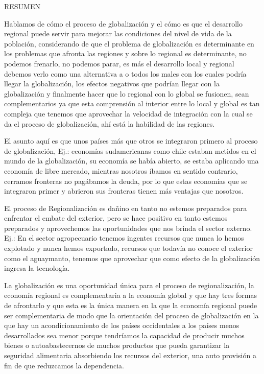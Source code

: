 \documentclass[
  a4paper,
]{article}
\begin{document}
RESUMEN

Hablamos de cómo el proceso de globalización y el cómo es que el
desarrollo regional puede servir para mejorar las condiciones del nivel
de vida de la población, considerando de que el problema de
globalización es determinante en los problemas que afronta las regiones
y sobre lo regional es determinante, no podemos frenarlo, no podemos
parar, es más el desarrollo local y regional debemos verlo como una
alternativa a o todos los males con los cuales podría llegar la
globalización, los efectos negativos que podrían llegar con la
globalización y finalmente hacer que lo regional con lo global se
fusionen, sean complementarios ya que esta comprensión al interior entre
lo local y global es tan compleja que tenemos que aprovechar la
velocidad de integración con la cual se da el proceso de globalización,
ahí está la habilidad de las regiones.

El asunto aquí es que unos países más que otros se integraron primero al
proceso de globalización, Ej.: economías sudamericanas como chile
estaban metidos en el mundo de la globalización, su economía se había
abierto, se estaba aplicando una economía de libre mercado, mientras
nosotros íbamos en sentido contrario, cerramos fronteras no pagábamos la
deuda, por lo que estas economías que se integraron primer y abrieron
sus fronteras tienen más ventajas que nosotros.

El proceso de Regionalización es dañino en tanto no estemos preparados
para enfrentar el embate del exterior, pero se hace positivo en tanto
estemos preparados y aprovechemos las oportunidades que nos brinda el
sector externo. Ej.: En el sector agropecuario tenemos ingentes recursos
que nunca lo hemos explotado y nunca hemos exportado, recursos que
todavía no conoce el exterior como el aguaymanto, tenemos que aprovechar
que como efecto de la globalización ingresa la tecnología.

La globalización es una oportunidad única para el proceso de
regionalización, la economía regional es complementaria a la economía
global y que hay tres formas de afrontarlo y que esta es la única manera
en la que la economía regional puede ser complementaria de modo que la
orientación del proceso de globalización en la que hay un
acondicionamiento de los países occidentales a los países menos
desarrollados sea menor porque tendríamos la capacidad de producir
muchos bienes o autoabastecernos de muchos productos que pueda
garantizar la seguridad alimentaria absorbiendo los recursos del
exterior, una auto provisión a fin de que reduzcamos la dependencia.
\end{document}

